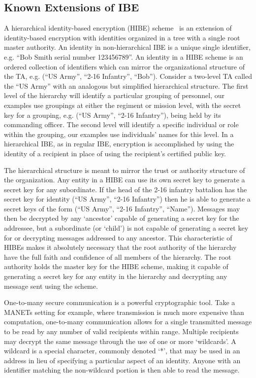\documentclass[10pt]{llncs}
\begin{document}
\subsection{Known Extensions of IBE}
A hierarchical identity-based encryption (HIBE)
scheme~\cite{Horowitz02} is an extension of identity-based
encryption with identities organized in a tree with a single root
master authority. An identity in non-hierarchical IBE is a unique
single identifier, e.g. ``Bob Smith serial number 123456789''. An
identity in a HIBE scheme is an ordered collection of identifiers
which can mirror the organizational structure of the TA, e.g. (``US
Army'', ``2-16 Infantry'', ``Bob''). Consider a two-level TA called
the ``US Army'' with an analogous but simplified hierarchical
structure. The first level of the hierarchy will identify a
particular grouping of personnel, our examples use groupings at
either the regiment or mission level, with the secret key for a
grouping, e.g. (``US Army'', ``2-16 Infantry''), being held by its
commanding officer. The second level will identify a specific
individual or role within the grouping, our examples use
individuals' names for this level. In a hierarchical IBE, as in
regular IBE, encryption is accomplished by using the identity of a
recipient in place of using the recipient's certified public key.

The hierarchical structure is meant to mirror the trust or authority structure of the organization. Any entity in a HIBE can use its own secret key to generate a secret key for any subordinate. If the head of the 2-16 infantry battalion has the secret key for identity (``US Army'', ``2-16 Infantry'') then he is able to generate a secret keys of the form (``US Army'', ``2-16 Infantry'', ``Name''). Messages may then be decrypted by any `ancestor' capable of generating a secret key for the addressee, but a subordinate (or `child') is not capable of generating a secret key for or decrypting messages addressed to any ancestor. This characteristic of HIBEs makes it absolutely necessary that the root authority of the hierarchy have the full faith and confidence of all members of the hierarchy. The root authority holds the master key for the HIBE scheme, making it capable of generating a secret key for any entity in the hierarchy and decrypting any message sent using the scheme.

    One-to-many secure communication is a powerful cryptographic tool.  Take a MANETs setting for example, where transmission is much more expensive than computation, one-to-many communication allows for a single transmitted message to be read by any number of valid recipients within range.  Multiple recipients may decrypt the same message through the use of one or more `wildcards'. A wildcard is a special character, commonly denoted `*', that may be used in an address in lieu of specifying a particular aspect of an identity. Anyone with an identifier matching the non-wildcard portion is then able to read the message.
\end{document}

